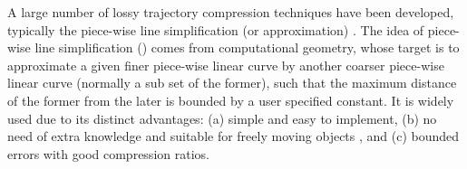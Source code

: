 A large number of lossy trajectory compression techniques have been developed, typically the piece-wise line simplification (or approximation) \cite{Douglas:Peucker, Hershberger:Speeding, Keogh:online,Liu:BQS, Muckell:Compression, Chen:Trajectory, Chen:Fast, Cao:Spatio, Shi:Survey}. The idea of piece-wise line simplification (\lsa) comes from computational geometry, whose target is to approximate a given finer piece-wise linear curve by another coarser piece-wise linear curve ({normally} a sub set of the former), such that the maximum distance of the former from the later is bounded by a user specified constant. It is widely used due to its distinct advantages: (a) simple and easy to implement, (b) no need of extra knowledge and suitable for freely  moving  objects \cite{Popa:Spatio}, and (c) bounded errors with good compression ratios.

